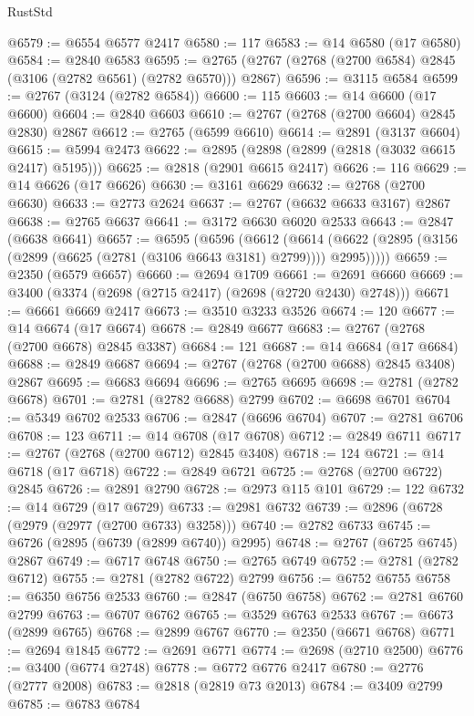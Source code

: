 \begin{lexlean}{RustStd}
\begin{coremodule}
@6579 := @6554 @6577 @2417
@6580 := 117
@6583 := @14 @6580 (@17 @6580)
@6584 := @2840 @6583
@6595 := @2765 (@2767 (@2768 (@2700 @6584) @2845 (@3106 (@2782 @6561) (@2782 @6570))) @2867)
@6596 := @3115 @6584
@6599 := @2767 (@3124 (@2782 @6584))
@6600 := 115
@6603 := @14 @6600 (@17 @6600)
@6604 := @2840 @6603
@6610 := @2767 (@2768 (@2700 @6604) @2845 @2830) @2867
@6612 := @2765 (@6599 @6610)
@6614 := @2891 (@3137 @6604)
@6615 := @5994 @2473
@6622 := @2895 (@2898 (@2899 (@2818 (@3032 @6615 @2417) @5195)))
@6625 := @2818 (@2901 @6615 @2417)
@6626 := 116
@6629 := @14 @6626 (@17 @6626)
@6630 := @3161 @6629
@6632 := @2768 (@2700 @6630)
@6633 := @2773 @2624
@6637 := @2767 (@6632 @6633 @3167) @2867
@6638 := @2765 @6637
@6641 := @3172 @6630 @6020 @2533
@6643 := @2847 (@6638 @6641)
@6657 := @6595
    (@6596
      (@6612
        (@6614 (@6622 (@2895 (@3156 (@2899 (@6625 (@2781 (@3106 @6643 @3181) @2799)))) @2995)))))
@6659 := @2350 (@6579 @6657)
@6660 := @2694 @1709
@6661 := @2691 @6660
@6669 := @3400 (@3374 (@2698 (@2715 @2417) (@2698 (@2720 @2430) @2748)))
@6671 := @6661 @6669 @2417
@6673 := @3510 @3233 @3526
@6674 := 120
@6677 := @14 @6674 (@17 @6674)
@6678 := @2849 @6677
@6683 := @2767 (@2768 (@2700 @6678) @2845 @3387)
@6684 := 121
@6687 := @14 @6684 (@17 @6684)
@6688 := @2849 @6687
@6694 := @2767 (@2768 (@2700 @6688) @2845 @3408) @2867
@6695 := @6683 @6694
@6696 := @2765 @6695
@6698 := @2781 (@2782 @6678)
@6701 := @2781 (@2782 @6688) @2799
@6702 := @6698 @6701
@6704 := @5349 @6702 @2533
@6706 := @2847 (@6696 @6704)
@6707 := @2781 @6706
@6708 := 123
@6711 := @14 @6708 (@17 @6708)
@6712 := @2849 @6711
@6717 := @2767 (@2768 (@2700 @6712) @2845 @3408)
@6718 := 124
@6721 := @14 @6718 (@17 @6718)
@6722 := @2849 @6721
@6725 := @2768 (@2700 @6722) @2845
@6726 := @2891 @2790
@6728 := @2973 @115 @101
@6729 := 122
@6732 := @14 @6729 (@17 @6729)
@6733 := @2981 @6732
@6739 := @2896 (@6728 (@2979 (@2977 (@2700 @6733) @3258)))
@6740 := @2782 @6733
@6745 := @6726 (@2895 (@6739 (@2899 @6740)) @2995)
@6748 := @2767 (@6725 @6745) @2867
@6749 := @6717 @6748
@6750 := @2765 @6749
@6752 := @2781 (@2782 @6712)
@6755 := @2781 (@2782 @6722) @2799
@6756 := @6752 @6755
@6758 := @6350 @6756 @2533
@6760 := @2847 (@6750 @6758)
@6762 := @2781 @6760 @2799
@6763 := @6707 @6762
@6765 := @3529 @6763 @2533
@6767 := @6673 (@2899 @6765)
@6768 := @2899 @6767
@6770 := @2350 (@6671 @6768)
@6771 := @2694 @1845
@6772 := @2691 @6771
@6774 := @2698 (@2710 @2500)
@6776 := @3400 (@6774 @2748)
@6778 := @6772 @6776 @2417
@6780 := @2776 (@2777 @2008)
@6783 := @2818 (@2819 @73 @2013)
@6784 := @3409 @2799
@6785 := @6783 @6784

\end{coremodule}
\end{lexlean}
